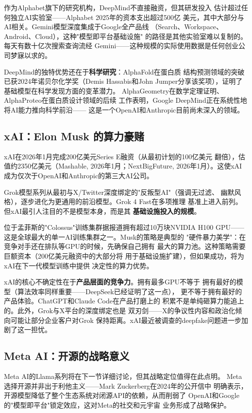 作为Alphabet旗下的研究机构，DeepMind不直接融资，但其研发投入
估计超过任何独立AI实验室——Alphabet 2025年的资本支出超过500亿
美元，其中大部分与AI相关。Gemini模型深度集成于Google全产品线
（Search、Workspace、Android、Cloud），这种"模型即平台基础设施"
的路径是其他实验室难以复制的。每天有数十亿次搜索查询流经
Gemini——这种规模的实际使用数据是任何创业公司梦寐以求的。

DeepMind的独特优势还在于\textbf{科学研究}：AlphaFold在蛋白质
结构预测领域的突破已获2024年诺贝尔化学奖（Demis Hassabis和John
Jumper分享该奖项），证明了基础模型在科学发现方面的变革潜力。
AlphaGeometry在数学定理证明、AlphaProteo在蛋白质设计领域的后续
工作表明，Google DeepMind正在系统性地将AI能力推向科学前沿——
这是一个OpenAI和Anthropic目前尚未深入的领域。

\subsection{xAI：Elon Musk 的算力豪赌}
\label{subsec:xai-recap}

xAI在2026年1月完成200亿美元Series E融资（从最初计划的100亿美元
翻倍），估值约2350亿美元（Mashable, 2026年1月；NextBigFuture,
2026年1月）。这使xAI成为仅次于OpenAI和Anthropic的第三大AI公司。

Grok模型系列从最初与X/Twitter深度绑定的"反叛型AI"（强调无过滤、
幽默风格），逐步进化为更通用的前沿模型。Grok 4 Fast在多项推理
基准上进入前列。但xAI最引人注目的不是模型本身，而是其
\textbf{基础设施投入的规模}。

位于孟菲斯的"Colossus"训练集群据报道拥有超过10万块NVIDIA H100
GPU——这是全球最大的单一AI训练集群之一。Musk的策略是典型的
"硬件暴力美学"：在竞争对手还在排队等GPU的时候，先确保自己拥有
最大的算力池。这种策略需要巨额资本（200亿美元融资中的大部分将
用于基础设施扩建），但如果成功，将为xAI在下一代模型训练中提供
决定性的算力优势。

xAI的核心不确定性在于\textbf{产品层面的竞争力}。拥有最多GPU不等于
拥有最好的模型（算法效率同样重要——DeepSeek已经证明了这一点），
更不等于拥有最好的产品体验。ChatGPT和Claude Code在产品打磨上的
积累不是单纯砸算力能追上的。此外，Grok与X平台的深度绑定也是
双刃剑——X的争议性内容和政治化倾向可能让部分企业客户对Grok
保持距离。xAI最近被调查的deepfake问题进一步加剧了这一担忧。

\subsection{Meta AI：开源的战略意义}
\label{subsec:meta-recap}

Meta AI的Llama系列将在下一节详细讨论，但其战略定位值得在此点明。
Meta选择开源并非出于利他主义——Mark Zuckerberg在2024年的公开信中
明确表示，开源模型降低了整个生态系统对闭源API的依赖，从而削弱了
OpenAI和Google的"模型即平台"锁定效应，这对Meta的社交和元宇宙
业务形成了战略保护。

